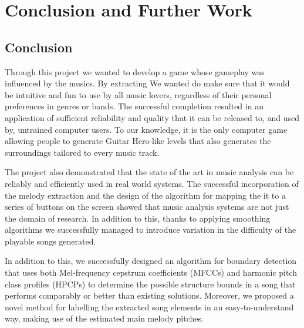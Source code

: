 
\chapter{Conclusion and Further Work} %

\label{Chapter7} %
\fancyhead[LE,RO]{\thepage}



\section{Conclusion}

Through this project we wanted to develop a game whose gameplay was influenced by the musics. By extracting We wanted do make sure that it would be intuitive and fun to use by all music lovers, regardless of their personal preferences in genres or bands. The successful completion resulted in an application of sufficient reliability and quality that it can be released to, and used by, untrained computer users. To our knowledge, it is the only computer game allowing people to generate Guitar Hero-like levels that also generates the surroundings tailored to every music track.

The project  also demonstrated that the state of the art in music analysis can be reliably and efficiently used in real world systems. The successful incorporation of the melody extraction and the design of the algorithm for mapping the it to a series of buttons on the screen showed that music analysis systems are not just the domain of research. In addition to this, thanks to applying smoothing algorithms we successfully managed to introduce variation in the difficulty of the playable songs generated.

In addition to this, we successfully designed an algorithm for boundary detection that uses both Mel-frequency cepstrum coefficients (MFCCs) and harmonic pitch class profiles (HPCPs) to determine the possible structure bounds in a song that performs comparably or better than existing solutions. Moreover, we proposed a novel method for labelling the extracted song elements in an easy-to-understand way, making use of the estimated main melody pitches. 

